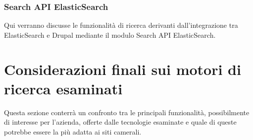 			\subsubsection{Search API ElasticSearch}
			Qui verranno discusse le funzionalità di ricerca derivanti dall'integrazione tra ElasticSearch e Drupal mediante il modulo Search API ElasticSearch.
			
	\section{Considerazioni finali sui motori di ricerca esaminati}
	Questa sezione conterrà un confronto tra le principali funzionalità, possibilmente di interesse per l'azienda, offerte dalle tecnologie esaminate e quale di queste potrebbe essere la più adatta ai siti camerali.